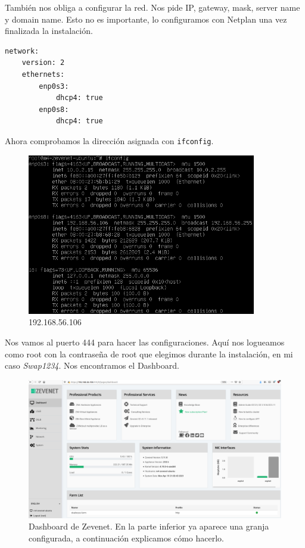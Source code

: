 \documentclass{article}
\begin{document}
También nos obliga a configurar la red. Nos pide IP, gateway, mask, server name y domain name. Esto no es importante,
lo configuramos con Netplan una vez finalizada la instalación.

\begin{Verbatim}[tabsize=4]
network:
	version: 2
	ethernets:
		enp0s3:
			dhcp4: true
		enp0s8:
			dhcp4: true
\end{Verbatim}

Ahora comprobamos la dirección asignada con \texttt{ifconfig}.

\begin{figure}[H]
	\centering
	\includegraphics[width=100mm]{imgs/zev-ifconfig}
	\caption{192.168.56.106}
\end{figure}

Nos vamos al puerto 444 para hacer las configuraciones. Aquí nos logueamos como root con la contraseña de root
que elegimos durante la instalación, en mi caso \emph{Swap1234}. Nos encontramos el Dashboard.

\begin{figure}[H]
	\centering
	\includegraphics[width=170mm]{imgs/zev-dashboard}
	\caption{Dashboard de Zevenet. En la parte inferior ya aparece una granja configurada, a continuación explicamos cómo hacerlo.}
\end{figure}
\end{document}
